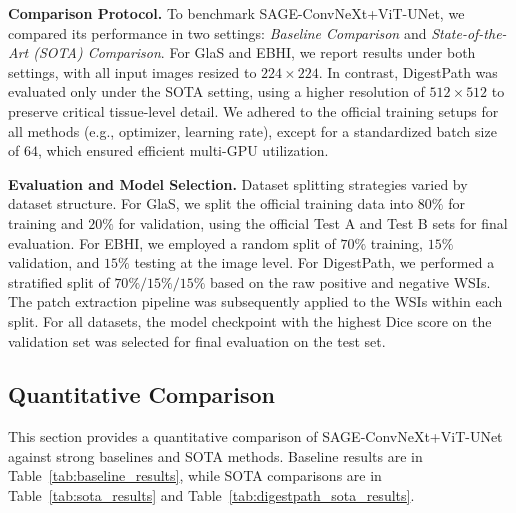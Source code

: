 
\noindent\textbf{Comparison Protocol.}
To benchmark SAGE-ConvNeXt+ViT-UNet, we compared its performance in two settings: \textit{Baseline Comparison} and \textit{State-of-the-Art (SOTA) Comparison}. For GlaS and EBHI, we report results under both settings, with all input images resized to $224 \times 224$. In contrast, DigestPath was evaluated only under the SOTA setting, using a higher resolution of $512 \times 512$ to preserve critical tissue-level detail. We adhered to the official training setups for all methods (e.g., optimizer, learning rate), except for a standardized batch size of $64$, which ensured efficient multi-GPU utilization.



\noindent\textbf{Evaluation and Model Selection.} Dataset splitting strategies varied by dataset structure. For GlaS, we split the official training data into $80\%$ for training and $20\%$ for validation, using the official Test A and Test B sets for final evaluation. For EBHI, we employed a random split of $70\%$ training, $15\%$ validation, and $15\%$ testing at the image level. For DigestPath, we performed a stratified split of $70\%/15\%/15\%$ based on the raw positive and negative WSIs. The patch extraction pipeline was subsequently applied to the WSIs within each split. For all datasets, the model checkpoint with the highest Dice score on the validation set was selected for final evaluation on the test set.

\subsection{Quantitative Comparison}

This section provides a quantitative comparison of SAGE-ConvNeXt+ViT-UNet against strong baselines and SOTA methods. Baseline results are in Table~\ref{tab:baseline_results}, while SOTA comparisons are in Table~\ref{tab:sota_results} and Table~\ref{tab:digestpath_sota_results}.


